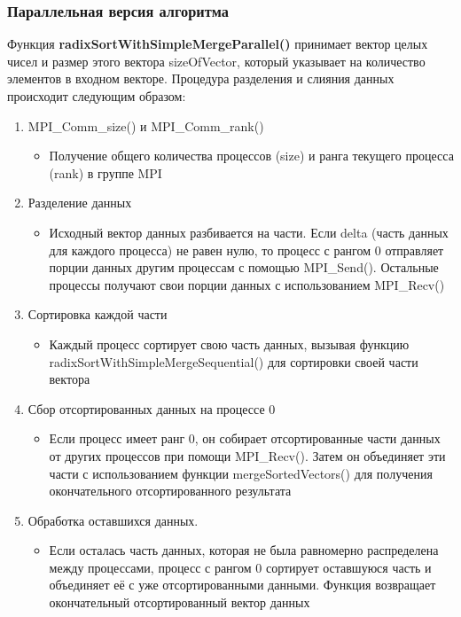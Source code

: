 \documentclass[a4paper, 14pt]{article}
\begin{document}
	\subsubsection*{\centering Параллельная версия алгоритма}
	Функция \textbf{radixSortWithSimpleMergeParallel()} принимает вектор целых чисел и размер этого вектора sizeOfVector, который указывает на количество элементов в входном векторе. Процедура разделения и слияния данных происходит следующим образом:
	\begin{enumerate}[leftmargin=3em]
		\item MPI\_Comm\_size() и MPI\_Comm\_rank()
		\begin{itemize}
			\setlength\itemsep{0cm}
			\item Получение общего количества процессов (size) и ранга текущего процесса (rank) в группе MPI
		\end{itemize}
		
		\item Разделение данных
		\begin{itemize}
			\setlength\itemsep{0cm}
			\item Исходный вектор данных разбивается на части. Если delta (часть данных для каждого процесса) не равен нулю, то процесс с рангом 0 отправляет порции данных другим процессам с помощью MPI\_Send(). Остальные процессы получают свои порции данных с использованием MPI\_Recv()
		\end{itemize}
		
		\item Сортировка каждой части
		\begin{itemize}
			\setlength\itemsep{0cm}
			\item Каждый процесс сортирует свою часть данных, вызывая функцию radixSortWithSimpleMergeSequential() для сортировки своей части вектора
		\end{itemize}
		
		\item Сбор отсортированных данных на процессе 0
		\begin{itemize}
			\setlength\itemsep{0cm}
			\item Если процесс имеет ранг 0, он собирает отсортированные части данных от других процессов при помощи MPI\_Recv(). Затем он объединяет эти части с использованием функции mergeSortedVectors() для получения окончательного отсортированного результата
		\end{itemize}
		
		\item Обработка оставшихся данных.
		\begin{itemize}
			\setlength\itemsep{0cm}
			\item Если осталась часть данных, которая не была равномерно распределена между процессами, процесс с рангом 0 сортирует оставшуюся часть и объединяет её с уже отсортированными данными. Функция возвращает окончательный отсортированный вектор данных
		\end{itemize}
		
	\end{enumerate}
	
\end{document}
